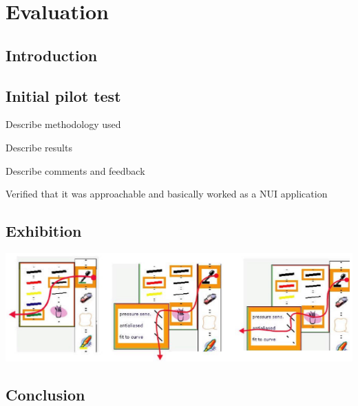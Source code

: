 \documentclass[11pt]{article}
\author{DESKTOP-RI55L4A}
\date{\today}
\title{}
\begin{document}
\tableofcontents


\section{Evaluation}
\label{sec:orgheadline5}
\subsection{Introduction}
\label{sec:orgheadline1}
\subsection{Initial pilot test}
\label{sec:orgheadline2}
\begin{description}
\item[{Introduction}] Describe methodology used
\item Describe results
\item Describe comments and feedback
\item Verified that it was approachable and basically worked as a NUI application
\end{description}
\subsection{Exhibition}
\label{sec:orgheadline3}

\includegraphics{crossy.png}

\subsection{Conclusion}
\label{sec:orgheadline4}
\end{document}
